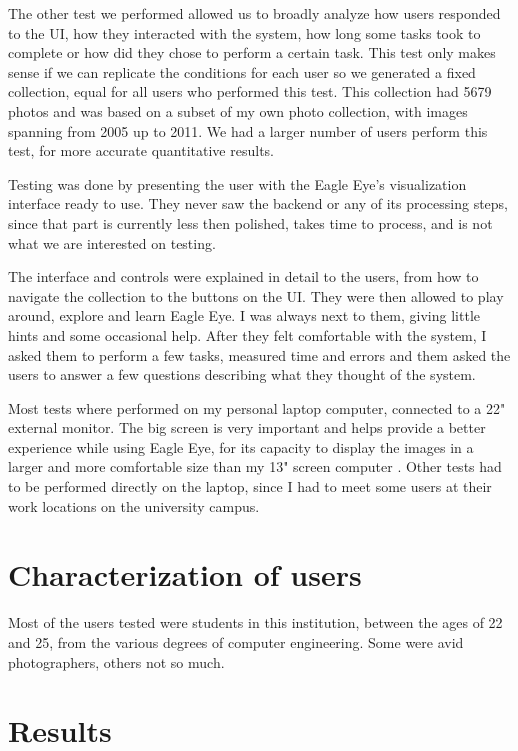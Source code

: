 The other test we performed allowed us to broadly analyze how users responded to the \ac{UI}, how they interacted with the system, how long some tasks took to complete or how did they chose to perform a certain task. This test only makes sense if we can replicate the conditions for each user so we generated a fixed collection, equal for all users who performed this test. This collection had 5679 photos and was based on a subset of my own photo collection, with images spanning from 2005 up to 2011. We had a larger number of users perform this test, for more accurate quantitative results.

Testing was done by presenting the user with the Eagle Eye's visualization interface ready to use. They never saw the backend or any of its processing steps, since that part is currently less then polished, takes time to process, and is not what we are interested on testing.

The interface and controls were explained in detail to the users, from how to navigate the collection to the buttons on the \ac{UI}. They were then allowed to play around, explore and learn Eagle Eye. I was always next to them, giving little hints and some occasional help. After they felt comfortable with the system, I asked them to perform a few tasks, measured time and errors and them asked the users to answer a few questions describing what they thought of the system.

Most tests where performed on my personal laptop computer, connected to a 22" external monitor. The big screen is very important and helps provide a better experience while using Eagle Eye, for its capacity to display the images in a larger and more comfortable size than my 13" screen computer . Other tests had to be performed directly on the laptop, since I had to meet some users at their work locations on the university campus.

\section{Characterization of users}

Most of the users tested were students in this institution, between the ages of 22 and 25, from the various degrees of computer engineering. Some were avid photographers, others not so much.



\section{Results}

